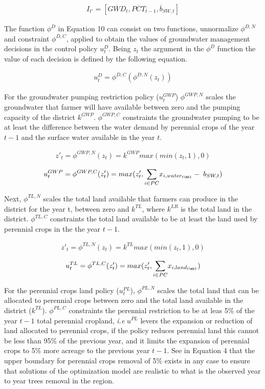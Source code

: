 \documentclass[11pt,a4paper]{article}
\begin{document}
\begin{align}
I_{t'} = [\overline{GWD}_{t},\overline{PCT}_{t-1},\overline{b}_{SW,t}]
\end{align}

The function $\phi^{D}$ in Equation 10 can consist on two functions, unnormalize $\phi^{D,N}$ and constraint $\phi^{D,C}$, applied to obtain the values of groundwater management decisions in the control policy $u_{t}^D$. Being $z_{t}$ the argument in the $\phi^{D}$ function the value of each decision is defined by the following equation.

\begin{align}
u^{D}_t = \phi^{D,C}(\phi^{D,N}(z_{t}))
\end{align}

For the groundwater pumping restriction policy ($u^{GWP}_t$) $\phi^{GWP,N}$ scales the groundwater that farmer will have available between zero and the pumping capacity of the district $k^{GWP}$. $\phi^{GWP,C}$ constraints the groundwater pumping to be at least the difference between the water demand by perennial crops of the year $t-1$ and the surface water available in the year $t$. 

\begin{align}
z'_{t}=\phi^{GWP,N}(z_{t}) = k^{GWP}max(min(z_{t},1),0) 
\end{align}

\begin{align}
u^{GWP}_t = \phi^{GWP,C}(z'_{t})= max(z'_{t},\underset{i \in PC}{\sum} x_{i,water_{t\mh1}} - \; b_{SW,t})
\end{align}

Next, $\phi^{TL,N}$ scales the total land available that farmers can produce in the district for the year t, between zero and $k^{TL}$, where $k^{LR}$ is the total land in the district. $\phi^{TL,C}$ constraints the total land available to be at least the land used by perennial crops in the the year $t-1$.

\begin{align}
z'_{t} = \phi^{TL,N}(z_{t}) = k^{TL}max(min(z_{t},1),0)
\end{align}

\begin{align}
u^{TL}_t = \phi^{TL,C}(z'_{t})= max(z'_{t},\underset{i \in PC}{\sum} x_{i,land_{t\mh1}})
\end{align}


For the perennial crops land policy ($u^{PL}_t$), $\phi^{PL,N}$ scales the total land that can be allocated to perennial crops between zero and the total land available in the district ($k^{TL}$). $\phi^{PL,C}$ constraints the perennial restriction to be at leas 5\% of the year $t-1$ total perennial cropland, \textit{i.e} $u^{PL}$ levers the expansion or reduction of land allocated to perennial crops, if the policy reduces perennial land this cannot be less than 95\% of the previous year, and it limits the expansion of perennial crops to 5\% more acreage to the previous year $t-1$. See in Equation 4 that the upper boundary for perennial crops removal of 5\% exists in any case to ensure that solutions of the optimization model are realistic to what is the observed year to year trees removal in the region.
\end{document}
